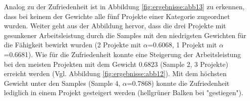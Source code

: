 Analog zu der Zufriedenheit ist in Abbildung \ref{fig:ergebnisse:abb13} zu erkennen, dass bei keinem der Gewichte alle fünf Projekte einer Kategorie zugeordnet wurden.
Weiter geht aus der Abbildung hervor, dass die drei Projekte mit gesunkener Arbeitsleistung durch die Samples mit den niedrigsten Gewichten für die Fähigkeit bewirkt wurden (2 Projekte mit $\alpha$=0.6068, 1 Projekt mit $\alpha$=0.6681).
Wie für die Zufriedenheit konnte eine Steigerung der Arbeitsleistung bei den meisten Projekten mit dem Gewicht 0.6823 (Sample 2, 3 Projekte) erreicht werden (Vgl. Abbildung \ref{fig:ergebnisse:abb12}).
Mit dem höchsten Gewicht unter den Samples (Sample 4, $\alpha$=0.7868) konnte die Zufriedenheit lediglich in einem Projekt gesteigert werden (hellgrüner Balken bei "gestiegen").

